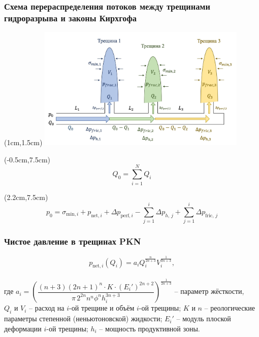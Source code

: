 \documentclass{beamer}
\begin{document}
\begin{frame}
\frametitle{Схема перераспределения потоков между трещинами гидроразрыва и законы Кирхгофа}

\begin{textblock*}{11cm}(1cm,1.5cm)
\includegraphics[width=10cm]{flow_distribution_scheme.jpg}
\end{textblock*}

\begin{textblock*}{4cm}(-0.5cm,7.5cm)
$$\boxed{Q_0=\sum\limits_{i=1}^{N}Q_i}$$
\end{textblock*}

\begin{textblock*}{11cm}(2.2cm,7.5cm)
$$\boxed{p_0=\sigma_{\text{min},i}+p_{\text{net},i}+\Delta p_{\text{perf},i}-\sum_{j=1}^{i}{\Delta p_{h,\,j}}+\sum_{j=1}^{i}\Delta p_{\text{fric},\,j}}$$
\end{textblock*}

\end{frame}


\begin{frame}
\frametitle{Чистое давление в трещинах PKN}

$$
p_{\text{net},i}(Q_i)=a_iQ_i^{\frac{n}{2n+3}}V_i^{\frac{1}{2n+3}},
$$\\
\small
где $a_i=\left(\dfrac{(n+3)(2n+1)^n \cdot K\cdot (E_i')^{2n+2}}{\pi\, 2^{2n}n^n\phi^n h_i^{3n+3}}\right)^{\!\frac{1}{2n+3}}$ -- параметр жёсткости,\newline\\
$Q_i$ и $V_i$ -- расход на $i$-ой трещине и объём $i$-ой трещины;\newline
$K$ и $n$ -- реологические параметры степенной (неньютоновской) жидкости;\newline
$E_i'$ -- модуль плоской деформации $i$-ой трещины;\newline
$h_i$ -- мощность продуктивной зоны.
\normalsize
\end{frame}
\end{document}
